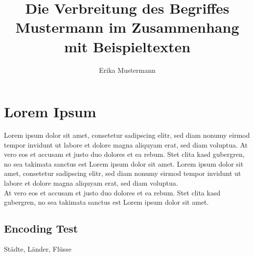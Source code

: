 \documentclass[f,bachelor,binding,twoside,palatino]{WeSTthesis}
\author{Erika Mustermann}
\title{Die Verbreitung des Begriffes \glqq{}Mustermann\grqq{} im Zusammenhang mit Beispieltexten}
\begin{document}
\maketitle%


\tableofcontents%

\cleardoublepage%



\section{Lorem Ipsum}
Lorem ipsum dolor sit amet, consetetur sadipscing elitr, sed diam nonumy eirmod tempor invidunt ut labore et dolore magna aliquyam erat, sed diam voluptua. At vero eos et accusam et justo duo dolores et ea rebum. Stet clita kasd gubergren, no sea takimata sanctus est Lorem ipsum dolor sit amet. Lorem ipsum dolor sit amet, consetetur sadipscing elitr, sed diam nonumy eirmod tempor invidunt ut labore et dolore magna aliquyam erat, sed diam voluptua.\\
At vero eos et accusam et justo duo dolores et ea rebum. Stet clita kasd gubergren, no sea takimata sanctus est Lorem ipsum dolor sit amet.

\subsection{Encoding Test}
Städte, Länder, Flüsse
\end{document}
